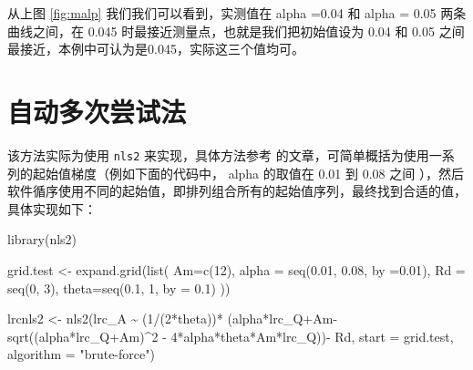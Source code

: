 \documentclass[
]{krantz}
\makeatletter
\newenvironment{Shaded}{\begin{snugshade}}{\end{snugshade}}
\newcommand{\AttributeTok}[1]{\textcolor[rgb]{0.77,0.63,0.00}{#1}}
\newcommand{\DecValTok}[1]{\textcolor[rgb]{0.00,0.00,0.81}{#1}}
\newcommand{\FloatTok}[1]{\textcolor[rgb]{0.00,0.00,0.81}{#1}}
\newcommand{\FunctionTok}[1]{\textcolor[rgb]{0.00,0.00,0.00}{#1}}
\newcommand{\NormalTok}[1]{#1}
\newcommand{\OtherTok}[1]{\textcolor[rgb]{0.56,0.35,0.01}{#1}}
\newcommand{\SpecialCharTok}[1]{\textcolor[rgb]{0.00,0.00,0.00}{#1}}
\newcommand{\StringTok}[1]{\textcolor[rgb]{0.31,0.60,0.02}{#1}}
\newenvironment{kframe}{%
\medskip{}
\setlength{\fboxsep}{.8em}
 \def\at@end@of@kframe{}%
 \ifinner\ifhmode%
  \def\at@end@of@kframe{\end{minipage}}%
  \begin{minipage}{\columnwidth}%
 \fi\fi%
 \def\FrameCommand##1{\hskip\@totalleftmargin \hskip-\fboxsep
 \colorbox{shadecolor}{##1}\hskip-\fboxsep
     \hskip-\linewidth \hskip-\@totalleftmargin \hskip\columnwidth}%
 \MakeFramed {\advance\hsize-\width
   \@totalleftmargin\z@ \linewidth\hsize
   \@setminipage}}%
 {\par\unskip\endMakeFramed%
 \at@end@of@kframe}
\renewenvironment{Shaded}{\begin{kframe}}{\end{kframe}}
\makeatother
\begin{document}
从上图 \ref{fig:malp} 我们我们可以看到，实测值在 alpha =0.04 和 alpha = 0.05 两条曲线之间，在 0.045 时最接近测量点，也就是我们把初始值设为 0.04 和 0.05 之间最接近，本例中可认为是0.045，实际这三个值均可。

\hypertarget{mult_try}{%
\section{自动多次尝试法}\label{mult_try}}

该方法实际为使用 \texttt{nls2} 来实现，具体方法参考 \citet{nls2} 的文章，可简单概括为使用一系列的起始值梯度（例如下面的代码中， alpha 的取值在 0.01 到 0.08 之间 ），然后软件循序使用不同的起始值，即排列组合所有的起始值序列，最终找到合适的值，具体实现如下：

\begin{Shaded}
\begin{Highlighting}[]
\FunctionTok{library}\NormalTok{(nls2)}

\NormalTok{grid.test }\OtherTok{\textless{}{-}} \FunctionTok{expand.grid}\NormalTok{(}\FunctionTok{list}\NormalTok{(}
  \AttributeTok{Am=}\FunctionTok{c}\NormalTok{(}\DecValTok{12}\NormalTok{),}
  \AttributeTok{alpha =} \FunctionTok{seq}\NormalTok{(}\FloatTok{0.01}\NormalTok{, }\FloatTok{0.08}\NormalTok{, }\AttributeTok{by =}\FloatTok{0.01}\NormalTok{),}
  \AttributeTok{Rd =} \FunctionTok{seq}\NormalTok{(}\DecValTok{0}\NormalTok{, }\DecValTok{3}\NormalTok{),}
  \AttributeTok{theta=}\FunctionTok{seq}\NormalTok{(}\FloatTok{0.1}\NormalTok{, }\DecValTok{1}\NormalTok{, }\AttributeTok{by =} \FloatTok{0.1}\NormalTok{)}
\NormalTok{  ))}

\NormalTok{lrcnls2 }\OtherTok{\textless{}{-}} \FunctionTok{nls2}\NormalTok{(lrc\_A }\SpecialCharTok{\textasciitilde{}} 
\NormalTok{        (}\DecValTok{1}\SpecialCharTok{/}\NormalTok{(}\DecValTok{2}\SpecialCharTok{*}\NormalTok{theta))}\SpecialCharTok{*}
\NormalTok{        (alpha}\SpecialCharTok{*}\NormalTok{lrc\_Q}\SpecialCharTok{+}\NormalTok{Am}\SpecialCharTok{{-}}\FunctionTok{sqrt}\NormalTok{((alpha}\SpecialCharTok{*}\NormalTok{lrc\_Q}\SpecialCharTok{+}\NormalTok{Am)}\SpecialCharTok{\^{}}\DecValTok{2} \SpecialCharTok{{-}} 
                               \DecValTok{4}\SpecialCharTok{*}\NormalTok{alpha}\SpecialCharTok{*}\NormalTok{theta}\SpecialCharTok{*}\NormalTok{Am}\SpecialCharTok{*}\NormalTok{lrc\_Q))}\SpecialCharTok{{-}} 
\NormalTok{        Rd, }\AttributeTok{start =}\NormalTok{ grid.test, }\AttributeTok{algorithm =} \StringTok{"brute{-}force"}\NormalTok{)}
\end{Highlighting}
\end{Shaded}
\end{document}
